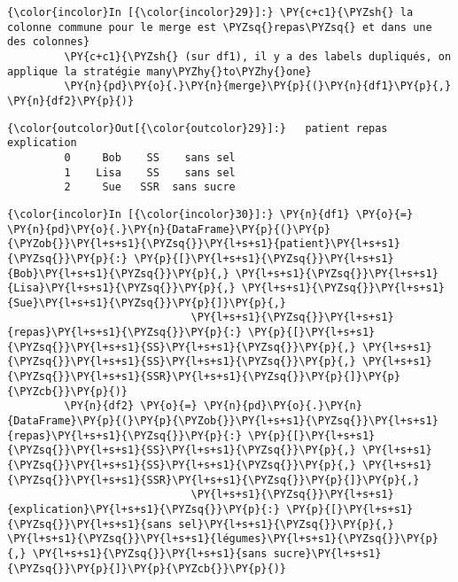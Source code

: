     \begin{Verbatim}[commandchars=\\\{\}]
{\color{incolor}In [{\color{incolor}29}]:} \PY{c+c1}{\PYZsh{} la colonne commune pour le merge est \PYZsq{}repas\PYZsq{} et dans une des colonnes}
         \PY{c+c1}{\PYZsh{} (sur df1), il y a des labels dupliqués, on applique la stratégie many\PYZhy{}to\PYZhy{}one}
         \PY{n}{pd}\PY{o}{.}\PY{n}{merge}\PY{p}{(}\PY{n}{df1}\PY{p}{,} \PY{n}{df2}\PY{p}{)}
\end{Verbatim}


\begin{Verbatim}[commandchars=\\\{\}]
{\color{outcolor}Out[{\color{outcolor}29}]:}   patient repas explication
         0     Bob    SS    sans sel
         1    Lisa    SS    sans sel
         2     Sue   SSR  sans sucre
\end{Verbatim}
            
    \begin{Verbatim}[commandchars=\\\{\}]
{\color{incolor}In [{\color{incolor}30}]:} \PY{n}{df1} \PY{o}{=} \PY{n}{pd}\PY{o}{.}\PY{n}{DataFrame}\PY{p}{(}\PY{p}{\PYZob{}}\PY{l+s+s1}{\PYZsq{}}\PY{l+s+s1}{patient}\PY{l+s+s1}{\PYZsq{}}\PY{p}{:} \PY{p}{[}\PY{l+s+s1}{\PYZsq{}}\PY{l+s+s1}{Bob}\PY{l+s+s1}{\PYZsq{}}\PY{p}{,} \PY{l+s+s1}{\PYZsq{}}\PY{l+s+s1}{Lisa}\PY{l+s+s1}{\PYZsq{}}\PY{p}{,} \PY{l+s+s1}{\PYZsq{}}\PY{l+s+s1}{Sue}\PY{l+s+s1}{\PYZsq{}}\PY{p}{]}\PY{p}{,}
                             \PY{l+s+s1}{\PYZsq{}}\PY{l+s+s1}{repas}\PY{l+s+s1}{\PYZsq{}}\PY{p}{:} \PY{p}{[}\PY{l+s+s1}{\PYZsq{}}\PY{l+s+s1}{SS}\PY{l+s+s1}{\PYZsq{}}\PY{p}{,} \PY{l+s+s1}{\PYZsq{}}\PY{l+s+s1}{SS}\PY{l+s+s1}{\PYZsq{}}\PY{p}{,} \PY{l+s+s1}{\PYZsq{}}\PY{l+s+s1}{SSR}\PY{l+s+s1}{\PYZsq{}}\PY{p}{]}\PY{p}{\PYZcb{}}\PY{p}{)}
         \PY{n}{df2} \PY{o}{=} \PY{n}{pd}\PY{o}{.}\PY{n}{DataFrame}\PY{p}{(}\PY{p}{\PYZob{}}\PY{l+s+s1}{\PYZsq{}}\PY{l+s+s1}{repas}\PY{l+s+s1}{\PYZsq{}}\PY{p}{:} \PY{p}{[}\PY{l+s+s1}{\PYZsq{}}\PY{l+s+s1}{SS}\PY{l+s+s1}{\PYZsq{}}\PY{p}{,} \PY{l+s+s1}{\PYZsq{}}\PY{l+s+s1}{SS}\PY{l+s+s1}{\PYZsq{}}\PY{p}{,} \PY{l+s+s1}{\PYZsq{}}\PY{l+s+s1}{SSR}\PY{l+s+s1}{\PYZsq{}}\PY{p}{]}\PY{p}{,}
                             \PY{l+s+s1}{\PYZsq{}}\PY{l+s+s1}{explication}\PY{l+s+s1}{\PYZsq{}}\PY{p}{:} \PY{p}{[}\PY{l+s+s1}{\PYZsq{}}\PY{l+s+s1}{sans sel}\PY{l+s+s1}{\PYZsq{}}\PY{p}{,} \PY{l+s+s1}{\PYZsq{}}\PY{l+s+s1}{légumes}\PY{l+s+s1}{\PYZsq{}}\PY{p}{,} \PY{l+s+s1}{\PYZsq{}}\PY{l+s+s1}{sans sucre}\PY{l+s+s1}{\PYZsq{}}\PY{p}{]}\PY{p}{\PYZcb{}}\PY{p}{)}
\end{Verbatim}


